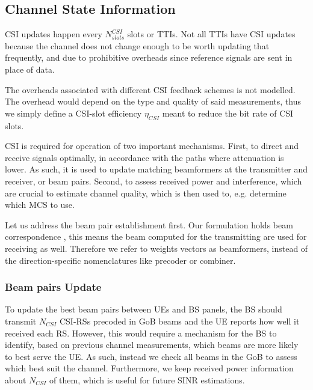 


\subsection{Channel State Information}

CSI updates happen every $N^{CSI}_{slots}$ slots or \acsp{TTI}. Not all TTIs have CSI updates because the channel does not change enough to be worth updating that frequently, and due to prohibitive overheads since reference signals are sent in place of data. 

The overheads associated with different \ac{CSI} feedback schemes is not modelled. The overhead would depend on the type and quality of said measurements, thus we simply define a CSI-slot efficiency $\eta_{CSI}$ meant to reduce the bit rate of CSI slots.

CSI is required for operation of two important mechanisms. First, to direct and receive signals optimally, in accordance with the paths where attenuation is lower. As such, it is used to update matching beamformers at the transmitter and receiver, or beam pairs. Second, to assess received power and interference, which are crucial to estimate channel quality, which is then used to, e.g. determine which MCS to use.

Let us address the beam pair establishment first. Our formulation holds beam correspondence \cite{beam_management}, this means the beam computed for the transmitting are used for receiving as well. Therefore we refer to weights vectors as beamformers, instead of the direction-specific nomenclatures like precoder or combiner.

\subsubsection*{Beam pairs Update}

To update the best beam pairs between UEs and BS panels, the BS should transmit $N_{CSI}$ CSI-RSs precoded in GoB beams and the UE reports how well it received each RS. However, this would require a mechanism for the BS to identify, based on previous channel measurements, which beams are more likely to best serve the UE. As such, instead we check all beams in the \ac{GoB} to assess which best suit the channel. Furthermore, we keep received power information about $N_{CSI}$ of them, which is useful for future SINR estimations.


